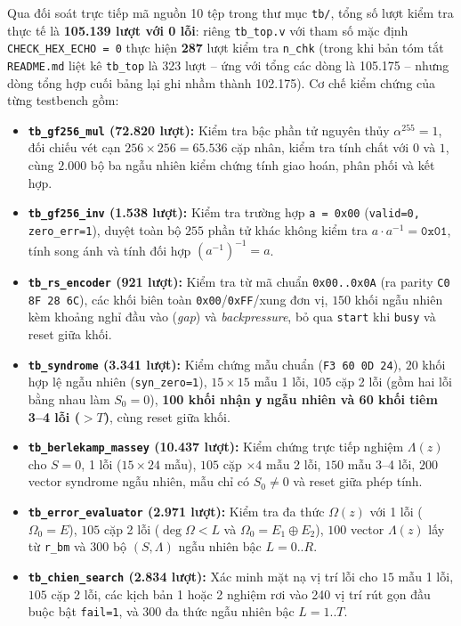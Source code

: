 \documentclass[11pt,a4paper]{report}
\begin{document}
Qua đối soát trực tiếp mã nguồn 10 tệp trong thư mục \texttt{tb/}, tổng số lượt kiểm tra thực tế là \textbf{105.139 lượt với 0 lỗi}: riêng \texttt{tb\_top.v} với tham số mặc định \texttt{CHECK\_HEX\_ECHO = 0} thực hiện \textbf{287} lượt kiểm tra \texttt{n\_chk} (trong khi bản tóm tắt \texttt{README.md} liệt kê \texttt{tb\_top} là 323 lượt -- ứng với tổng các dòng là 105.175 -- nhưng dòng tổng hợp cuối bảng lại ghi nhầm thành 102.175). Cơ chế kiểm chứng của từng testbench gồm:
\begin{itemize}
    \item \textbf{\texttt{tb\_gf256\_mul} (72.820 lượt):} Kiểm tra bậc phần tử nguyên thủy $\alpha^{255}=1$, đối chiếu vét cạn $256\times 256=65.536$ cặp nhân, kiểm tra tính chất với $0$ và $1$, cùng $2.000$ bộ ba ngẫu nhiên kiểm chứng tính giao hoán, phân phối và kết hợp.
    \item \textbf{\texttt{tb\_gf256\_inv} (1.538 lượt):} Kiểm tra trường hợp \texttt{a = 0x00} (\texttt{valid=0, zero\_err=1}), duyệt toàn bộ $255$ phần tử khác không kiểm tra $a\cdot a^{-1}=\texttt{0x01}$, tính song ánh và tính đối hợp $(a^{-1})^{-1}=a$.
    \item \textbf{\texttt{tb\_rs\_encoder} (921 lượt):} Kiểm tra từ mã chuẩn \texttt{0x00..0x0A} (ra parity \texttt{C0 8F 28 6C}), các khối biên toàn \texttt{0x00}/\texttt{0xFF}/xung đơn vị, $150$ khối ngẫu nhiên kèm khoảng nghỉ đầu vào (\textit{gap}) và \textit{backpressure}, bỏ qua \texttt{start} khi \texttt{busy} và reset giữa khối.
    \item \textbf{\texttt{tb\_syndrome} (3.341 lượt):} Kiểm chứng mẫu chuẩn (\texttt{F3 60 0D 24}), $20$ khối hợp lệ ngẫu nhiên (\texttt{syn\_zero=1}), $15\times 15$ mẫu 1 lỗi, $105$ cặp 2 lỗi (gồm hai lỗi bằng nhau làm $S_0=0$), \textbf{100 khối nhận \texttt{y} ngẫu nhiên và 60 khối tiêm 3--4 lỗi ($>T$)}, cùng reset giữa khối.
    \item \textbf{\texttt{tb\_berlekamp\_massey} (10.437 lượt):} Kiểm chứng trực tiếp nghiệm $\Lambda(z)$ cho $S=0$, 1 lỗi ($15\times 24$ mẫu), $105$ cặp $\times 4$ mẫu 2 lỗi, $150$ mẫu 3--4 lỗi, $200$ vector syndrome ngẫu nhiên, mẫu chỉ có $S_0\neq 0$ và reset giữa phép tính.
    \item \textbf{\texttt{tb\_error\_evaluator} (2.971 lượt):} Kiểm tra đa thức $\Omega(z)$ với 1 lỗi ($\Omega_0=E$), $105$ cặp 2 lỗi ($\deg\Omega < L$ và $\Omega_0=E_1\oplus E_2$), $100$ vector $\Lambda(z)$ lấy từ \texttt{r\_bm} và $300$ bộ $(S,\Lambda)$ ngẫu nhiên bậc $L=0..R$.
    \item \textbf{\texttt{tb\_chien\_search} (2.834 lượt):} Xác minh mặt nạ vị trí lỗi cho $15$ mẫu 1 lỗi, $105$ cặp 2 lỗi, các kịch bản 1 hoặc 2 nghiệm rơi vào 240 vị trí rút gọn đầu buộc bật \texttt{fail=1}, và $300$ đa thức ngẫu nhiên bậc $L=1..T$.

\end{itemize}
\end{document}

